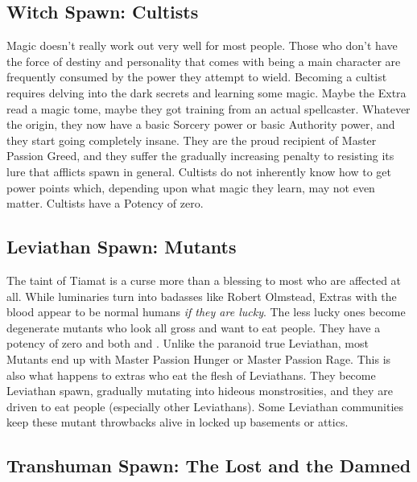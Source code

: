 \subsection{Witch Spawn: Cultists} 

Magic doesn't really work out very well for most people. Those who don't have the force of destiny and personality that comes with being a main character are frequently consumed by the power they attempt to wield. Becoming a cultist requires delving into the dark secrets and learning some magic. Maybe the Extra read a magic tome, maybe they got training from an actual spellcaster. Whatever the origin, they now have a basic Sorcery power or basic Authority power, and they start going completely insane. They are the proud recipient of Master Passion Greed, and they suffer the gradually increasing penalty to resisting its lure that afflicts spawn in general. Cultists do not inherently know how to get power points which, depending upon what magic they learn, may not even matter. Cultists have a Potency of zero.

\subsection{Leviathan Spawn: Mutants} 

The taint of Tiamat is a curse more than a blessing to most who are affected at all. While luminaries turn into badasses like Robert Olmstead, Extras with the blood appear to be normal humans \textit{if they are lucky}. The less lucky ones become degenerate mutants who look all gross and want to eat people. They have a potency of zero and both  and . Unlike the paranoid true Leviathan, most Mutants end up with Master Passion Hunger or Master Passion Rage. This is also what happens to extras who eat the flesh of Leviathans. They become Leviathan spawn, gradually mutating into hideous monstrosities, and they are driven to eat people (especially other Leviathans). Some Leviathan communities keep these mutant throwbacks alive in locked up basements or attics.

\subsection{Transhuman Spawn: The Lost and the Damned}

